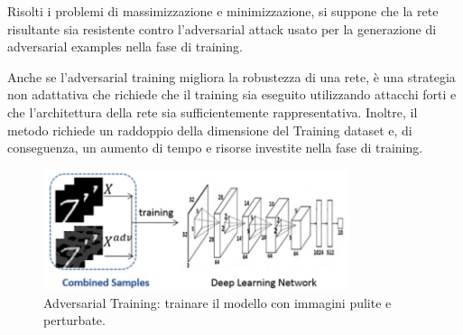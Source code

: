         Risolti i problemi di massimizzazione e minimizzazione, si suppone che la rete risultante sia resistente contro l'adversarial attack usato per la generazione di adversarial examples nella fase di training.
        
        Anche se l'adversarial training migliora la robustezza di una rete, è una strategia non adattativa che richiede che il training sia eseguito utilizzando attacchi forti e che l'architettura della rete sia sufficientemente rappresentativa.
        Inoltre, il metodo richiede un raddoppio della dimensione del Training dataset e, di conseguenza, un aumento di tempo e risorse investite nella fase di training.
            \begin{figure}[!h]
                \centering
                \includegraphics[width=0.8\textwidth]{Images/Mitigation/Adversarial training.png}
                \caption{Adversarial Training: trainare il modello con immagini pulite e perturbate.}
                \label{Adversarial Training}
            \end{figure}
    \newpage
    
